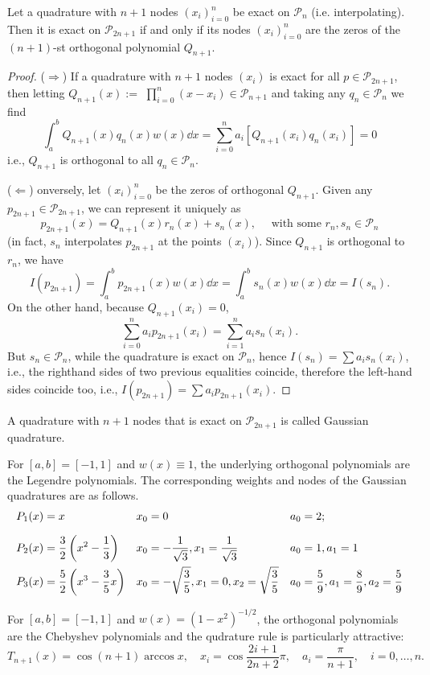 \documentclass[a4paper]{article}
\begin{document}
\begin{theorem}
    Let a quadrature with $n+1$ nodes $(x_i)_{i=0}^n$ be exact on $\mathcal{P}_n$ (i.e. interpolating). Then it is exact on $\mathcal{P}_{2 n+1}$ if and only if its nodes $(x_i)_{i=0}^n$ are the zeros of the $(n+1)$-st orthogonal polynomial $Q_{n+1}$.
\end{theorem}
\begin{proof}
    ($ \Longrightarrow $) If a quadrature with $n+1$ nodes $(x_i)$ is exact for all $p \in \mathcal{P}_{2 n+1}$, then letting $Q_{n+1}(x):=$ $\prod_{i=0}^n(x-x_i) \in \mathcal{P}_{n+1}$ and taking any $q_n \in \mathcal{P}_n$ we find
    \[
    \int_a^b Q_{n+1}(x) q_n(x) w(x) \dd{x}=\sum_{i=0}^n a_i[Q_{n+1}(x_i) q_n(x_i)]=0
    \]
    i.e., $Q_{n+1}$ is orthogonal to all $q_n \in \mathcal{P}_n$.

    ($ \Longleftarrow $) onversely, let $(x_i)_{i=0}^n$ be the zeros of orthogonal $Q_{n+1}$. Given any $p_{2 n+1} \in \mathcal{P}_{2 n+1}$, we can represent it uniquely as
    \[
    p_{2 n+1}(x)=Q_{n+1}(x) r_n(x)+s_n(x), \quad \text { with some } r_n, s_n \in \mathcal{P}_n
    \]
    (in fact, $s_n$ interpolates $p_{2 n+1}$ at the points $(x_i)$). Since $Q_{n+1}$ is orthogonal to $r_n$, we have
    \[
    I(p_{2 n+1})=\int_a^b p_{2 n+1}(x) w(x) \dd{x}=\int_a^b s_n(x) w(x) \dd{x}=I(s_n) .
    \]
    On the other hand, because $Q_{n+1}(x_i)=0$,
    \[
    \sum_{i=0}^n a_i p_{2 n+1}(x_i)=\sum_{i=1}^n a_i s_n(x_i) .
    \]
    But $s_n \in \mathcal{P}_n$, while the quadrature is exact on $\mathcal{P}_n$, hence $I(s_n)=\sum a_i s_n(x_i)$, i.e., the righthand sides of two previous equalities coincide, therefore the left-hand sides coincide too, i.e., $I(p_{2 n+1})=\sum a_i p_{2 n+1}(x_i)$.
\end{proof}

\begin{definition}
    A quadrature with $n+1$ nodes that is exact on $\mathcal{P}_{2 n+1}$ is called Gaussian quadrature.
\end{definition}
\begin{example}
    For $[a, b]=[-1,1]$ and $w(x) \equiv 1$, the underlying orthogonal polynomials are the Legendre polynomials. The corresponding weights and nodes of the Gaussian quadratures are as follows.
\[
\begin{array}{*3{>{\displaystyle}l}}
P_1(x)=x & x_0=0 & a_0=2 ; \\[1em]
P_2(x)=\frac{3}{2}\left(x^2-\frac{1}{3}\right) & x_0=-\frac{1}{\sqrt{3}}, x_1=\frac{1}{\sqrt{3}} & a_0=1, a_1=1 \\[1em]
P_3(x)=\frac{5}{2}\left(x^3-\frac{3}{5} x\right) & x_0=-\sqrt{\frac{3}{5}}, x_1=0, x_2=\sqrt{\frac{3}{5}} & a_0=\frac{5}{9}, a_1=\frac{8}{9}, a_2=\frac{5}{9}
\end{array}
\]
\end{example}
\begin{example}
    For $[a, b]=[-1,1]$ and $w(x)=\left(1-x^2\right)^{-1 / 2}$, the orthogonal polynomials are the Chebyshev polynomials and the qudrature rule is particularly attractive:
\[
T_{n+1}(x)=\cos (n+1) \arccos x, \quad x_i=\cos \frac{2 i+1}{2 n+2} \pi, \quad a_i=\frac{\pi}{n+1}, \quad i=0, \ldots, n .
\]
\end{example}
\end{document}
